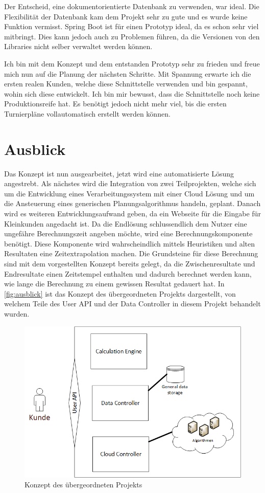 Der Entscheid, eine dokumentorientierte Datenbank zu verwenden, war ideal. Die Flexibilität der Datenbank kam dem Projekt sehr zu gute und es wurde keine Funktion vermisst. Spring Boot ist für 
einen Prototyp ideal, da es schon sehr viel mitbringt. Dies kann jedoch auch zu Problemen führen, da die Versionen von den Libraries nicht selber verwaltet werden können. 

Ich bin mit dem Konzept und dem entstanden Prototyp sehr zu frieden und freue mich nun auf die Planung der nächsten Schritte. Mit Spannung erwarte ich die ersten realen Kunden, welche diese 
Schnittstelle verwenden und bin gespannt, wohin sich diese entwickelt. Ich bin mir bewusst, dass die Schnittstelle noch keine Produktionsreife hat. Es benötigt jedoch nicht mehr viel, bis die ersten 
Turnierpläne vollautomatisch erstellt werden können.

\section{Ausblick}\label{fazit_ausblick}

Das Konzept ist nun ausgearbeitet, jetzt wird eine automatisierte Lösung angestrebt. Als nächstes wird die Integration von zwei Teilprojekten, welche sich um die Entwicklung eines 
Verarbeitungssystem mit einer Cloud Lösung und um die Ansteuerung eines generischen Planungsalgorithmus handeln, geplant. Danach wird es weiteren Entwicklungsaufwand geben, da ein 
Webseite für die Eingabe für Kleinkunden angedacht ist. Da die Endlösung schlussendlich dem Nutzer eine ungefähre Berechnungszeit angeben möchte, wird eine Berechnungskomponente 
benötigt. Diese Komponente wird wahrscheindlich mittels Heuristiken und alten Resultaten eine Zeitextrapolation machen. Die Grundsteine für diese Berechnung sind mit dem vorgestellten Konzept 
bereits gelegt, da die Zwischenresultate und Endresultate einen Zeitstempel enthalten und dadurch berechnet werden kann, wie lange die Berechnung zu einem gewissen Resultat gedauert hat. In 
\autoref{fig:ausblick} ist das Konzept des übergeordneten Projekts dargestellt, von welchem Teile des User API und der Data Controller in diesem Projekt behandelt wurden.

\begin{figure}[h]
\centering
\includegraphics[scale=0.8]{images/visio/ausblick.png}
\caption[Konzept des übergeordneten Projekts]{Konzept des übergeordneten Projekts \selfmade{}}
\label{fig:ausblick}
\end{figure}
